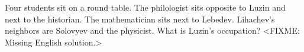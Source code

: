 \problem
Four students sit on a round table.
The philologist sits opposite to Luzin and next to the historian.
The mathematician sits next to Lebedev.
Lihachev's neighbors are Solovyev and the physicist.
What is Luzin's occupation?
\solution
<FIXME: Missing English solution.>
\endproblem
